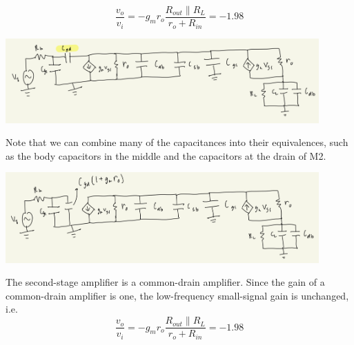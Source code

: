 \documentclass{article}
\begin{document}
\begin{subparts}
  \begin{equation}
    \frac{v_{o}}{v_{i}} = -g_{m} r_{o} \frac{R_{out} \parallel R_{L}}{r_{o} + R_{in}} = -1.98
  \end{equation}
  \item
  \begin{center}
    \includegraphics[width=0.9\textwidth]{q3d.png}
  \end{center}
  Note that we can combine many of the capacitances into their equivalences, such as the body capacitors in the middle and the capacitors at the drain of M2.
  \item
  \begin{center}
    \includegraphics[width=0.9\textwidth]{q3e.png}
  \end{center}
  \item
  The second-stage amplifier is a common-drain amplifier.
  Since the gain of a common-drain amplifier is one, the low-frequency small-signal gain is unchanged, i.e.
  \begin{equation}
    \frac{v_{o}}{v_{i}} = -g_{m} r_{o} \frac{R_{out} \parallel R_{L}}{r_{o} + R_{in}} = -1.98
  \end{equation}
\end{subparts}
\end{document}
